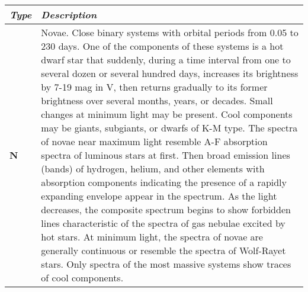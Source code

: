 \begin{longtabu} to \textwidth {l|X}
\toprule
\emph{Type} & \emph{Description}\\
\midrule
\textbf{N} & Novae. Close binary systems with orbital periods from 0.05
to 230 days. One of the components of these systems is a hot dwarf star
that suddenly, during a time interval from one to several dozen or
several hundred days, increases its brightness by 7-19 mag in V, then
returns gradually to its former brightness over several months, years,
or decades. Small changes at minimum light may be present. Cool
components may be giants, subgiants, or dwarfs of K-M type. The spectra
of novae near maximum light resemble A-F absorption spectra of luminous
stars at first. Then broad emission lines (bands) of hydrogen, helium,
and other elements with absorption components indicating the presence of
a rapidly expanding envelope appear in the spectrum. As the light
decreases, the composite spectrum begins to show forbidden lines
characteristic of the spectra of gas nebulae excited by hot stars. At
minimum light, the spectra of novae are generally continuous or resemble
the spectra of Wolf-Rayet stars. Only spectra of the most massive
systems show traces of cool components.


\end{longtabu}
